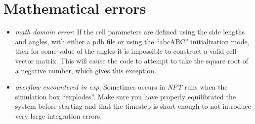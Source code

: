 \documentclass[11pt,english,fleqn]{report}
\begin{document}
\section{Mathematical errors}
\begin{itemize}
\item \emph{math domain error}: If the cell parameters are defined using
the side lengths and angles, with either a pdb file or using the {}``abcABC''
initialization mode, then for some value of the angles it is impossible
to construct a valid cell vector matrix. This will cause the code
to attempt to take the square root of a negative number, which gives
this exception.
\item \emph{overflow encountered in exp}: Sometimes occurs in \emph{NPT} runs
when the simulation box {}``explodes''. Make sure you have properly
equilibrated the system before starting and that the timestep is short
enough to not introduce very large integration errors.
\end{itemize}


\end{document}
